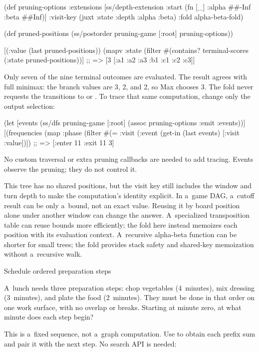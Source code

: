 {{{(def pruning-options
  {:extensions [ss/depth-extension
                {:start (fn [_] {:alpha ##-Inf :beta ##Inf})}]
   :visit-key (juxt :state :depth :alpha :beta)
   :fold alpha-beta-fold})

(def pruned-positions
  (ss/postorder pruning-game [:root] pruning-options))

[(:value (last pruned-positions))
 (mapv :state (filter #(contains? terminal-scores (:state %
                     pruned-positions))]
;; => [3 [:a1 :a2 :a3 :b1 :c1 :c2 :c3]]
\endtt

Only seven of the nine terminal outcomes are evaluated. The result agrees
with full minimax: the branch values are 3, 2, and 2, so Max chooses 3.
The fold never requests the transitions to  or .
To trace that same computation, change only the output selection:

\begtt {}
(let [events (ss/dfs pruning-game [:root]
                     (assoc pruning-options :emit :events))]
  [(frequencies (map :phase (filter #(= :visit (:event %
   (get-in (last events) [:visit :value])])
;; => [{:enter 11 :exit 11} 3]
\endtt

No custom traversal or extra pruning callbacks are needed to add tracing.
Events observe the pruning; they do not control it.

This tree has no shared positions, but the visit key still includes the
window and turn depth to make the computation's identity explicit. In
a~game DAG, a~cutoff result can be only a~bound, not an exact value.
Reusing it by board position alone under another window can change the
answer. A~specialized transposition table can reuse bounds more efficiently;
the fold here instead memoizes each position with its evaluation context.
A~recursive alpha-beta function can be shorter for small trees; the fold
provides stack safety and shared-key memoization without a~recursive walk.

\secc Schedule ordered preparation steps

 A~lunch needs three preparation steps: chop
vegetables (4~minutes), mix dressing (3~minutes), and plate the food
(2~minutes). They must be done in that order on one work surface, with no
overlap or breaks. Starting at minute zero, at what minute does each step
begin?

\smallskip
{} This is a~fixed sequence, not a~graph computation.
Use  to obtain each prefix sum and pair it with the next
step. No search API is needed:

}}}
